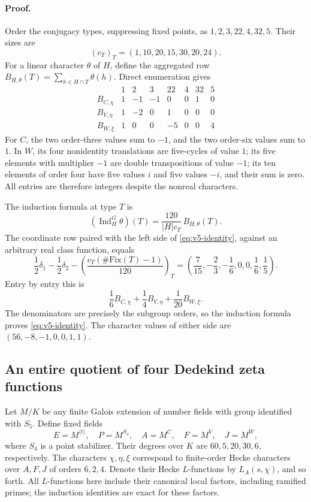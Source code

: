 \paragraph{Proof.}
Order the conjugacy types, suppressing fixed points, as
$1,2,3,22,4,32,5$. Their sizes are
\[
(c_T)_T=(1,10,20,15,30,20,24).
\]
For a linear character $\theta$ of $H$, define the aggregated row
$B_{H,\theta}(T)=\sum_{h\in H\cap T}\theta(h)$.
Direct enumeration gives
\[
\begin{array}{c|rrrrrrr}
 &1&2&3&22&4&32&5\\ \hline
B_{C,\chi}&1&-1&-1&0&0&1&0\\
B_{V,\eta}&1&-2&0&1&0&0&0\\
B_{W,\xi}&1&0&0&-5&0&0&4
\end{array}
\]
For $C$, the two order-three values sum to $-1$, and the two
order-six values sum to $1$. In $W$, its four nonidentity translations
are five-cycles of value $1$; its five elements with multiplier $-1$
are double transpositions of value $-1$; its ten elements of order four
have five values $i$ and five values $-i$, and their sum is zero.
All entries are therefore integers despite the nonreal characters.

The induction formula at type $T$ is
\[
 (\operatorname{Ind}_{H}^{G}\theta)(T)
 =\frac{120}{|H|c_T}\,B_{H,\theta}(T).
\]
The coordinate row paired with the left side of
\eqref{eq:v5-identity}, against an arbitrary real class function, equals
\[
 \frac12\delta_1-\frac12\delta_2
 -\left(\frac{c_T(\#\mathrm{Fix}(T)-1)}{120}\right)_T
 =\left(\frac7{15},-\frac23,-\frac16,0,0,\frac16,\frac15\right).
\]
Entry by entry this is
\[
 \frac16 B_{C,\chi}+\frac14 B_{V,\eta}+\frac1{20}B_{W,\xi}.
\]
The denominators are precisely the subgroup orders, so the induction
formula proves \eqref{eq:v5-identity}. The character values of either
side are $(56,-8,-1,0,0,1,1)$.

\subsection{An entire quotient of four Dedekind zeta functions}

Let $M/K$ be any finite Galois extension of number fields with group
identified with $S_5$. Define fixed fields
\[
 E=M^{\langle t\rangle},\quad P=M^{S_4},\quad
 A=M^C,\quad F=M^V,\quad J=M^W,
\]
where $S_4$ is a point stabilizer. Their degrees over $K$ are
$60,5,20,30,6$, respectively. The characters $\chi,\eta,\xi$ correspond
to finite-order Hecke characters over $A,F,J$ of orders $6,2,4$.
Denote their Hecke $L$-functions by $L_A(s,\chi)$, and so forth.
All $L$-functions here include their canonical local factors, including
ramified primes; the induction identities are exact for these factors.

